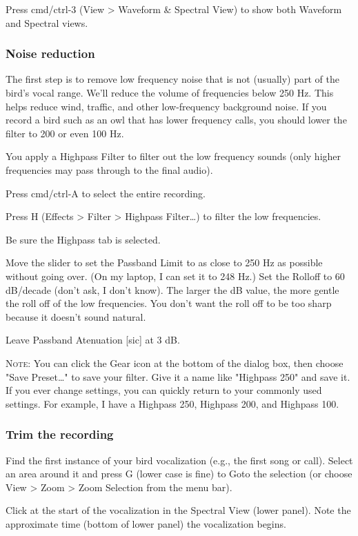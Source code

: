 \documentclass[12pt]{article}
\begin{document}
Press cmd/ctrl-3 (View > Waveform \& Spectral View) to show both Waveform and Spectral views.


\subsubsection*{Noise reduction}

The first step is to remove low frequency noise that is not (usually) part of the bird's vocal range. We'll reduce the volume of frequencies below 250 Hz. This helps reduce wind, traffic, and other low-frequency background noise. If you record a bird such as an owl that has lower frequency calls, you should lower the filter to 200 or even 100 Hz.

You apply a Highpass Filter to filter out the low frequency sounds (only higher frequencies may pass through to the final audio).

Press cmd/ctrl-A to select the entire recording.

Press H (Effects > Filter > Highpass Filter\ldots) to filter the low frequencies.

Be sure the Highpass tab is selected.

Move the slider to set the Passband Limit to as close to 250 Hz as possible without going over. (On my laptop, I can set it to 248 Hz.) Set the Rolloff to 60 dB/decade (don't ask, I don't know). The larger the dB value, the more gentle the roll off of the low frequencies. You don't want the roll off to be too sharp because it doesn't sound natural.

Leave Passband Atenuation [sic] at 3 dB. 

\textsc{Note:} You can click the Gear icon at the bottom of the dialog box, then choose "Save Preset\ldots" to save your filter. Give it a name like "Highpass 250" and save it. If you ever change settings, you can quickly return to your commonly used settings. For example, I have a Highpass 250, Highpass 200, and Highpass 100.


\subsubsection*{Trim the recording}

Find the first instance of your bird vocalization (e.g., the first song or call). Select an area around it and press G (lower case is fine) to Goto the selection (or choose View > Zoom > Zoom Selection from the menu bar).

Click at the start of the vocalization in the Spectral View (lower panel). Note the approximate time (bottom of lower panel) the vocalization begins. 
\end{document}
